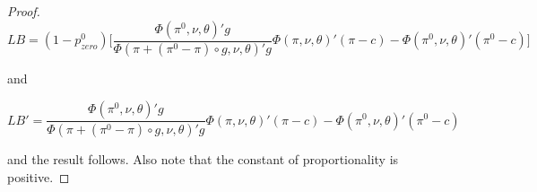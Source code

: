 \documentclass[12pt]{article}
\begin{document}
\begin{proof}
\begin{equation*}
LB = (1-p_{zero}^0) \bigg[ \frac{ \Phi(\pi^0,\nu, \theta)' g }{\Phi(\pi + (\pi^0 - \pi) \circ g,\nu, \theta)' g}  \Phi(\pi,\nu,\theta)'(\pi-c) - \Phi(\pi^0,\nu,\theta)'(\pi^0-c) \bigg]
\end{equation*}

and 

\begin{equation*}
LB' = \frac{ \Phi(\pi^0,\nu, \theta)' g }{\Phi(\pi + (\pi^0 - \pi) \circ g,\nu, \theta)' g}  \Phi(\pi,\nu,\theta)'(\pi-c) - \Phi(\pi^0,\nu,\theta)'(\pi^0-c)
\end{equation*}

and the result follows.
Also note that the constant of proportionality is positive.

\end{proof}

\newpage
{}
%

\end{document}
